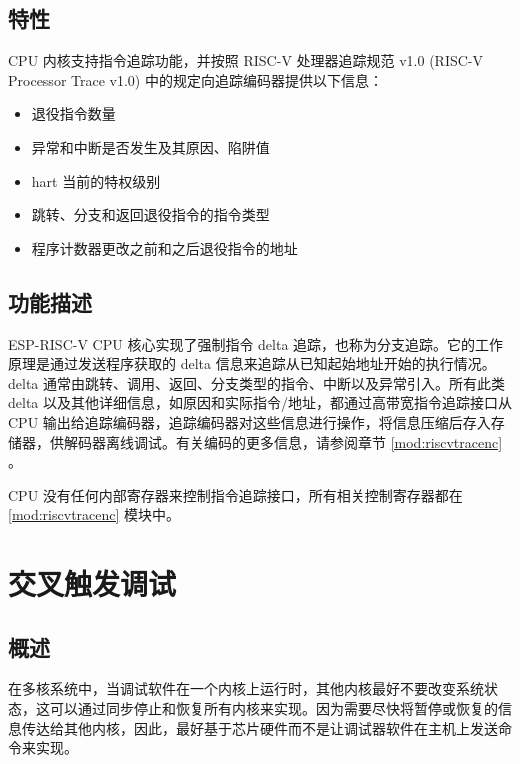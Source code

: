 \documentclass[main\_\_CN.tex]{subfiles}
\begin{document}
\subsection{特性}
\label{sec:riscvcpu-trace-features}

CPU 内核支持指令追踪功能，并按照 RISC-V 处理器追踪规范 v1.0 (RISC-V Processor Trace v1.0) 中的规定向追踪编码器提供以下信息：

\begin{itemize}
    \item 退役指令数量
    \item 异常和中断是否发生及其原因、陷阱值
    \item hart 当前的特权级别
    \item 跳转、分支和返回退役指令的指令类型
    \item 程序计数器更改之前和之后退役指令的地址
\end{itemize}

\subsection{功能描述}
\label{sec:riscvcpu-trace-func-descr}

ESP-RISC-V CPU 核心实现了强制指令 delta 追踪，也称为分支追踪。它的工作原理是通过发送程序获取的 delta 信息来追踪从已知起始地址开始的执行情况。delta 通常由跳转、调用、返回、分支类型的指令、中断以及异常引入。所有此类 delta 以及其他详细信息，如原因和实际指令/地址，都通过高带宽指令追踪接口从 CPU 输出给追踪编码器，追踪编码器对这些信息进行操作，将信息压缩后存入存储器，供解码器离线调试。有关编码的更多信息，请参阅章节 \ref{mod:riscvtracenc} \textit{}。

CPU 没有任何内部寄存器来控制指令追踪接口，所有相关控制寄存器都在 \ref{mod:riscvtracenc} \textit{} 模块中。


\clearpage
\section{交叉触发调试}
\label{sec:riscvcpu-cti}

\subsection{概述}
\label{sec:riscvcpu-cti-overview}

在多核系统中，当调试软件在一个内核上运行时，其他内核最好不要改变系统状态，这可以通过同步停止和恢复所有内核来实现。因为需要尽快将暂停或恢复的信息传达给其他内核，因此，最好基于芯片硬件而不是让调试器软件在主机上发送命令来实现。
\end{document}
